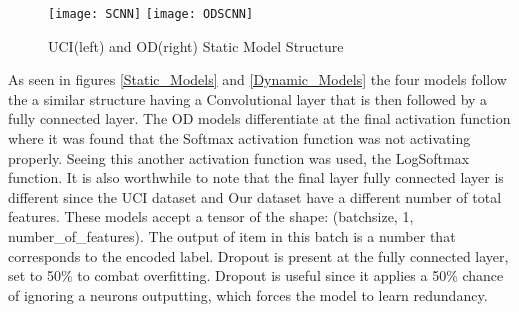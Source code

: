 \begin{figure}[h]
\centering
\texttt{[image: SCNN]}\hfill
\texttt{[image: ODSCNN]}\hfill
\caption{UCI(left) and OD(right) Static Model Structure}
\label{fig:Static_Models}
\end{figure}

As seen in figures \ref{Static_Models} and \ref{Dynamic_Models} the four models follow the a similar structure having a Convolutional layer that is then followed by a fully connected layer.
The OD models differentiate at the final activation function where it was found that the Softmax activation function was not activating properly.
Seeing this another activation function was used, the LogSoftmax function.
It is also worthwhile to note that the final layer fully connected layer is different since the UCI dataset and Our dataset have a different number of total features.
These models accept a tensor of the shape: (batchsize, 1, number\_of\_features).
The output of item in this batch is a number that corresponds to the encoded label.
Dropout is present at the fully connected layer, set to 50\% to combat overfitting.
Dropout is useful since it applies a 50\% chance of ignoring a neurons outputting, which forces the model to learn redundancy.